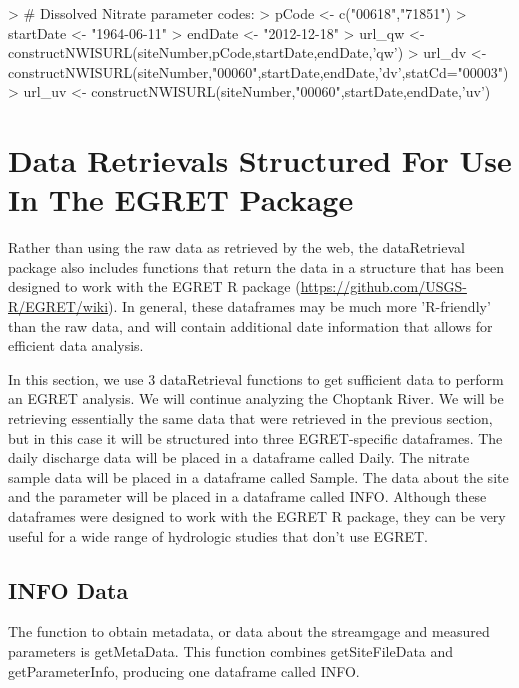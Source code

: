 \documentclass[a4paper,11pt]{article}
\begin{document}
\begin{Schunk}
\begin{Sinput}
> # Dissolved Nitrate parameter codes:
> pCode <- c("00618","71851")
> startDate <- "1964-06-11"
> endDate <- "2012-12-18"
> url_qw <- constructNWISURL(siteNumber,pCode,startDate,endDate,'qw')
> url_dv <- constructNWISURL(siteNumber,"00060",startDate,endDate,'dv',statCd="00003")
> url_uv <- constructNWISURL(siteNumber,"00060",startDate,endDate,'uv')
\end{Sinput}
\end{Schunk}

\FloatBarrier
\section{Data Retrievals Structured For Use In The EGRET Package}
Rather than using the raw data as retrieved by the web, the dataRetrieval package also includes functions that return the data in a structure that has been designed to work with the EGRET R package (\url{https://github.com/USGS-R/EGRET/wiki}). In general, these dataframes may be much more 'R-friendly' than the raw data, and will contain additional date information that allows for efficient data analysis.

In this section, we use 3 dataRetrieval functions to get sufficient data to perform an EGRET analysis.  We will continue analyzing the Choptank River. We will be retrieving essentially the same data that were retrieved in the previous section, but in this case it will be structured into three EGRET-specific dataframes.  The daily discharge data will be placed in a dataframe called Daily.  The nitrate sample data will be placed in a dataframe called Sample.  The data about the site and the parameter will be placed in a dataframe called INFO.  Although these dataframes were designed to work with the EGRET R package, they can be very useful for a wide range of hydrologic studies that don't use EGRET.

\subsection{INFO Data}
The function to obtain metadata, or data about the streamgage and measured parameters is getMetaData. This function combines getSiteFileData and getParameterInfo, producing one dataframe called INFO.
\end{document}
